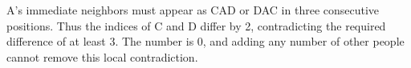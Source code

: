 A's immediate neighbors must appear as CAD or DAC in three consecutive positions. Thus the indices of C and D differ by 2, contradicting the required difference of at least 3. The number is $\boxed 0$, and adding any number of other people cannot remove this local contradiction.
